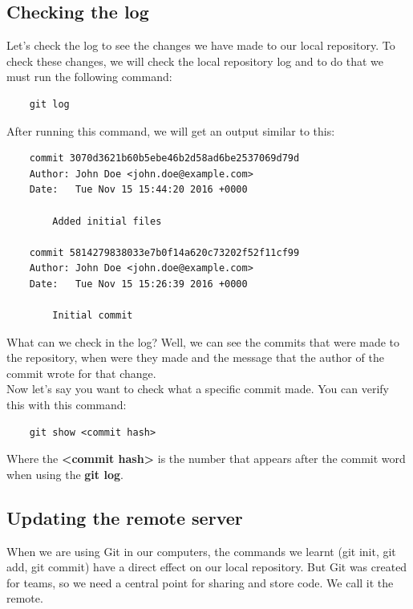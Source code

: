 \documentclass{article}
\begin{document}
\subsection{Checking the log}

Let's check the log to see the changes we have made to our local repository. To check these changes, we will check the local repository log and to do that we must run the following command:

\begin{lstlisting}
	git log
\end{lstlisting}

After running this command, we will get an output similar to this:

\begin{lstlisting}
	commit 3070d3621b60b5ebe46b2d58ad6be2537069d79d
	Author: John Doe <john.doe@example.com>
	Date:   Tue Nov 15 15:44:20 2016 +0000

    	Added initial files

	commit 5814279838033e7b0f14a620c73202f52f11cf99
	Author: John Doe <john.doe@example.com>
	Date:   Tue Nov 15 15:26:39 2016 +0000

    	Initial commit
\end{lstlisting}

What can we check in the log? Well, we can see the commits that were made to the repository, when were they made and the message that the author of the commit wrote for that change.\\

Now let's say you want to check what a specific commit made. You can verify this with this command:

\begin{lstlisting}
	git show <commit hash>
\end{lstlisting}

Where the \textbf{\textless commit hash\textgreater} is the number that appears after the commit word when using the \textbf{git log}.\\

\subsection{Updating the remote server}

When we are using Git in our computers, the commands we learnt (git init, git add, git commit) have a direct effect on our local repository. But Git was created for teams, so we need a central point for sharing and store code. We call it the remote.\\
\end{document}
